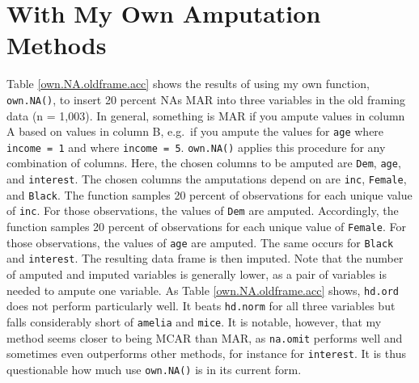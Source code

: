 \documentclass[12pt,econ]{sources/authesis}
\begin{document}
\hypertarget{app-ordmiss-own}{%
\section{With My Own Amputation Methods}\label{app-ordmiss-own}}

Table \ref{own.NA.oldframe.acc} shows the results of using my own function, \texttt{own.NA()}, to insert 20 percent NAs MAR into three variables in the old framing data (n = 1,003). In general, something is MAR if you ampute values in column A based on values in column B, e.g.~if you ampute the values for \texttt{age} where \texttt{income\ =\ 1} and where \texttt{income\ =\ 5}. \texttt{own.NA()} applies this procedure for any combination of columns. Here, the chosen columns to be amputed are \texttt{Dem}, \texttt{age}, and \texttt{interest}. The chosen columns the amputations depend on are \texttt{inc}, \texttt{Female}, and \texttt{Black}. The function samples 20 percent of observations for each unique value of \texttt{inc}. For those observations, the values of \texttt{Dem} are amputed. Accordingly, the function samples 20 percent of observations for each unique value of \texttt{Female}. For those observations, the values of \texttt{age} are amputed. The same occurs for \texttt{Black} and \texttt{interest}. The resulting data frame is then imputed. Note that the number of amputed and imputed variables is generally lower, as a pair of variables is needed to ampute one variable. As Table \ref{own.NA.oldframe.acc} shows, \texttt{hd.ord} does not perform particularly well. It beats \texttt{hd.norm} for all three variables but falls considerably short of \texttt{amelia} and \texttt{mice}. It is notable, however, that my method seems closer to being MCAR than MAR, as \texttt{na.omit} performs well and sometimes even outperforms other methods, for instance for \texttt{interest}. It is thus questionable how much use \texttt{own.NA()} is in its current form.
\end{document}
